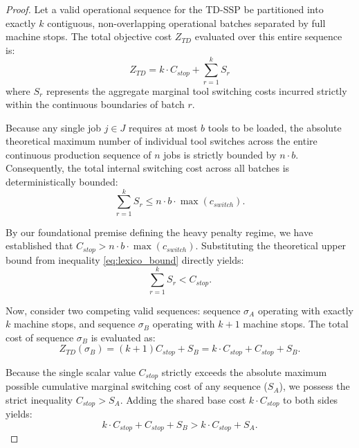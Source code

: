 \documentclass[11pt, a4paper]{book}
\begin{document}
	\begin{proof}
		Let a valid operational sequence for the TD-SSP be partitioned into exactly $k$ contiguous, non-overlapping operational batches separated by full machine stops. The total objective cost $Z_{TD}$ evaluated over this entire sequence is:
		\begin{equation}
			Z_{TD} = k \cdot C_{stop} + \sum_{r=1}^{k} S_r
		\end{equation}
		where $S_r$ represents the aggregate marginal tool switching costs incurred strictly within the continuous boundaries of batch $r$. 
		
		Because any single job $j \in J$ requires at most $b$ tools to be loaded, the absolute theoretical maximum number of individual tool switches across the entire continuous production sequence of $n$ jobs is strictly bounded by $n \cdot b$. Consequently, the total internal switching cost across all batches is deterministically bounded:
		\begin{equation}
			\sum_{r=1}^{k} S_r \le n \cdot b \cdot \max(c_{switch}). \label{eq:lexico_bound}
		\end{equation}
		
		By our foundational premise defining the heavy penalty regime, we have established that $C_{stop} > n \cdot b \cdot \max(c_{switch})$. Substituting the theoretical upper bound from inequality \eqref{eq:lexico_bound} directly yields:
		\begin{equation}
			\sum_{r=1}^{k} S_r < C_{stop}.
		\end{equation}
		
		Now, consider two competing valid sequences: sequence $\sigma_A$ operating with exactly $k$ machine stops, and sequence $\sigma_B$ operating with $k+1$ machine stops. The total cost of sequence $\sigma_B$ is evaluated as:
		\begin{equation}
			Z_{TD}(\sigma_B) = (k + 1)C_{stop} + S_B = k \cdot C_{stop} + C_{stop} + S_B.
		\end{equation}
		
		Because the single scalar value $C_{stop}$ strictly exceeds the absolute maximum possible cumulative marginal switching cost of any sequence ($S_A$), we possess the strict inequality $C_{stop} > S_A$. Adding the shared base cost $k \cdot C_{stop}$ to both sides yields:
		\begin{equation}
			k \cdot C_{stop} + C_{stop} + S_B > k \cdot C_{stop} + S_A.
		\end{equation}
		

\end{proof}
\end{document}
